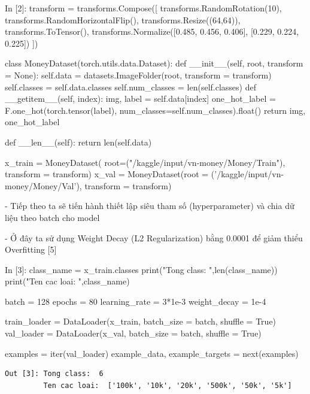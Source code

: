 \documentclass[12pt, a4paper]{article}
\begin{document}
\begin{python}
In [2]: transform = transforms.Compose([
                transforms.RandomRotation(10),      
                transforms.RandomHorizontalFlip(),  
                transforms.Resize((64,64)),             
                transforms.ToTensor(),
                transforms.Normalize([0.485, 0.456, 0.406],
                                     [0.229, 0.224, 0.225])
        ])
        
        class MoneyDataset(torch.utils.data.Dataset):
            def __init__(self, root, transform = None):
                self.data = datasets.ImageFolder(root, transform = transform)
                self.classes = self.data.classes
                self.num_classes = len(self.classes)
            def __getitem__(self, index):
                img, label = self.data[index]
                one_hot_label = F.one_hot(torch.tensor(label), num_classes=self.num_classes).float()
                return img, one_hot_label   
            
            def __len__(self):
                    return len(self.data)
                
        x_train = MoneyDataset( root=("/kaggle/input/vn-money/Money/Train"), transform = transform)
        x_val = MoneyDataset(root = ('/kaggle/input/vn-money/Money/Val'), transform = transform)
\end{python}
\par - Tiếp theo ta sẽ tiến hành thiết lập siêu tham số (hyperparameter) và chia dữ liệu theo batch
cho model
\par - Ở đây ta sử dụng Weight Decay (L2 Regularization) bằng 0.0001 để giảm thiểu Overfitting [5]

\begin{python}
In [3]: class_name = x_train.classes
        print("Tong class: ",len(class_name))
        print("Ten cac loai: ",class_name)
        
        batch = 128
        epochs = 80
        learning_rate = 3*1e-3
        weight_decay = 1e-4
        
        train_loader = DataLoader(x_train, batch_size = batch, shuffle = True)
        val_loader = DataLoader(x_val, batch_size = batch, shuffle = True)
        
        
        examples = iter(val_loader)
        example_data, example_targets = next(examples)
\end{python}

\begin{verbatim}
Out [3]: Tong class:  6
         Ten cac loai:  ['100k', '10k', '20k', '500k', '50k', '5k'] 
\end{verbatim}
\end{document}
